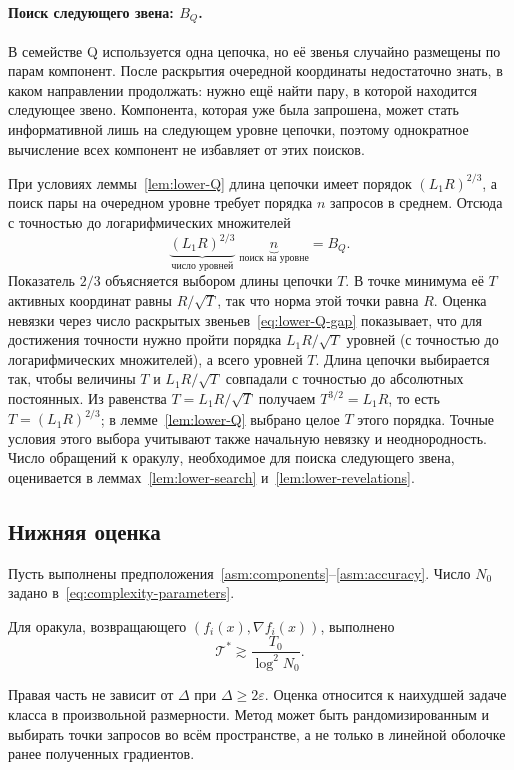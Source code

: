 \paragraph{Поиск следующего звена: $B_Q$.}
В семействе Q используется одна цепочка, но её звенья случайно
размещены по парам компонент. После раскрытия очередной координаты
недостаточно знать, в каком направлении продолжать: нужно ещё
найти пару, в которой находится следующее звено. Компонента, которая уже
была запрошена, может стать информативной лишь на следующем уровне
цепочки, поэтому однократное вычисление всех компонент не избавляет
от этих поисков.

При условиях леммы~\ref{lem:lower-Q} длина цепочки имеет порядок
$(L_1R)^{2/3}$, а поиск пары на очередном уровне требует порядка $n$
запросов в среднем. Отсюда с точностью до логарифмических множителей
\[
 \underbrace{(L_1R)^{2/3}}_{\text{число уровней}}
 \;\underbrace{n}_{\text{поиск на уровне}}
 =B_Q.
\]
Показатель $2/3$ объясняется выбором длины цепочки $T$.
В точке минимума её $T$ активных координат равны $R/\sqrt T$, так
что норма этой точки равна $R$. Оценка невязки через число раскрытых
звеньев~\eqref{eq:lower-Q-gap} показывает, что для достижения точности
нужно пройти порядка $L_1R/\sqrt T$ уровней (с точностью до
логарифмических множителей), а всего уровней $T$. Длина цепочки
выбирается так, чтобы величины $T$ и $L_1R/\sqrt T$ совпадали
с точностью до абсолютных постоянных. Из равенства $T=L_1R/\sqrt T$
получаем $T^{3/2}=L_1R$, то есть $T=(L_1R)^{2/3}$; в
лемме~\ref{lem:lower-Q} выбрано целое $T$ этого порядка.
Точные условия этого выбора учитывают также начальную
невязку и неоднородность. Число обращений к оракулу, необходимое
для поиска следующего звена, оценивается в леммах~\ref{lem:lower-search}
и~\ref{lem:lower-revelations}.

\subsection{Нижняя оценка}

Пусть выполнены предположения~\ref{asm:components}--\ref{asm:accuracy}.
Число $N_0$ задано в~\eqref{eq:complexity-parameters}.

\begin{theorem}\label{thm:lower}
Для оракула, возвращающего $(f_i(x),\nabla f_i(x))$, выполнено
\[
 \mathcal T^\ast\gtrsim\frac{T_0}{\log^2N_0}.
\]
\end{theorem}

Правая часть не зависит от $\Delta$ при $\Delta\ge2\varepsilon$.
Оценка относится к наихудшей задаче класса в произвольной размерности.
Метод может быть рандомизированным и выбирать точки запросов во всём
пространстве, а не только в линейной оболочке ранее полученных градиентов.

